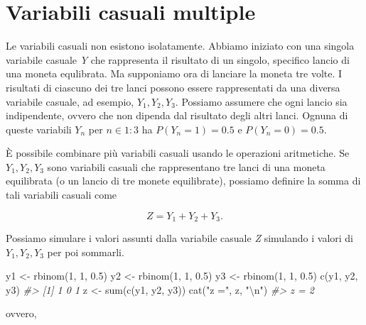 \documentclass[
  11pt,
]{krantz}
\makeatletter
\newenvironment{Shaded}{\begin{snugshade}}{\end{snugshade}}
\newcommand{\CommentTok}[1]{\textcolor[rgb]{0.37,0.37,0.37}{\textit{#1}}}
\newcommand{\DecValTok}[1]{\textcolor[rgb]{0.06,0.06,0.06}{#1}}
\newcommand{\FloatTok}[1]{\textcolor[rgb]{0.06,0.06,0.06}{#1}}
\newcommand{\FunctionTok}[1]{\textcolor[rgb]{0,0,0}{#1}}
\newcommand{\NormalTok}[1]{#1}
\newcommand{\OtherTok}[1]{\textcolor[rgb]{0.37,0.37,0.37}{#1}}
\newcommand{\SpecialCharTok}[1]{\textcolor[rgb]{0,0,0}{#1}}
\newcommand{\StringTok}[1]{\textcolor[rgb]{0.5,0.5,0.5}{#1}}
\newenvironment{kframe}{%
\medskip{}
\setlength{\fboxsep}{.8em}
 \def\at@end@of@kframe{}%
 \ifinner\ifhmode%
  \def\at@end@of@kframe{\end{minipage}}%
  \begin{minipage}{\columnwidth}%
 \fi\fi%
 \def\FrameCommand##1{\hskip\@totalleftmargin \hskip-\fboxsep
 \colorbox{shadecolor}{##1}\hskip-\fboxsep
     \hskip-\linewidth \hskip-\@totalleftmargin \hskip\columnwidth}%
 \MakeFramed {\advance\hsize-\width
   \@totalleftmargin\z@ \linewidth\hsize
   \@setminipage}}%
 {\par\unskip\endMakeFramed%
 \at@end@of@kframe}
\renewenvironment{Shaded}{\begin{kframe}}{\end{kframe}}
\theoremstyle{definition}
\theoremstyle{definition}
\theoremstyle{definition}
\theoremstyle{definition}
\theoremstyle{remark}
\makeatother
\begin{document}
\hypertarget{variabili-casuali-multiple}{%
\section{Variabili casuali multiple}\label{variabili-casuali-multiple}}

Le variabili casuali non esistono isolatamente. Abbiamo iniziato con una singola variabile casuale \emph{Y} che rappresenta il risultato di un singolo, specifico lancio di una moneta equlibrata. Ma supponiamo ora di lanciare la moneta tre volte. I risultati di ciascuno dei tre lanci possono essere rappresentati da una diversa variabile casuale, ad esempio, \(Y_1 , Y_2 , Y_3\). Possiamo assumere che ogni lancio sia indipendente, ovvero che non dipenda dal risultato degli altri lanci. Ognuna di queste variabili \(Y_n\) per \(n \in 1:3\) ha \(P(Y_n =1)=0.5\) e \(P(Y_n =0)=0.5\).

È possibile combinare più variabili casuali usando le operazioni aritmetiche. Se \(Y_1 , Y_2, Y_3\) sono variabili casuali che rappresentano tre lanci di una moneta equilibrata (o un lancio di tre monete equilibrate), possiamo definire la somma di tali variabili casuali come

\[
Z = Y_1 + Y_2 + Y_3.
\]

Possiamo simulare i valori assunti dalla variabile casuale \emph{Z} simulando i valori di \(Y_1, Y_2, Y_3\) per poi sommarli.

\begin{Shaded}
\begin{Highlighting}[]
\NormalTok{y1 }\OtherTok{\textless{}{-}} \FunctionTok{rbinom}\NormalTok{(}\DecValTok{1}\NormalTok{, }\DecValTok{1}\NormalTok{, }\FloatTok{0.5}\NormalTok{)}
\NormalTok{y2 }\OtherTok{\textless{}{-}} \FunctionTok{rbinom}\NormalTok{(}\DecValTok{1}\NormalTok{, }\DecValTok{1}\NormalTok{, }\FloatTok{0.5}\NormalTok{)}
\NormalTok{y3 }\OtherTok{\textless{}{-}} \FunctionTok{rbinom}\NormalTok{(}\DecValTok{1}\NormalTok{, }\DecValTok{1}\NormalTok{, }\FloatTok{0.5}\NormalTok{)}
\FunctionTok{c}\NormalTok{(y1, y2, y3)}
\CommentTok{\#\textgreater{} [1] 1 0 1}
\NormalTok{z }\OtherTok{\textless{}{-}} \FunctionTok{sum}\NormalTok{(}\FunctionTok{c}\NormalTok{(y1, y2, y3))}
\FunctionTok{cat}\NormalTok{(}\StringTok{"z ="}\NormalTok{, z, }\StringTok{"}\SpecialCharTok{\textbackslash{}n}\StringTok{"}\NormalTok{)}
\CommentTok{\#\textgreater{} z = 2}
\end{Highlighting}
\end{Shaded}

ovvero,
\end{document}
